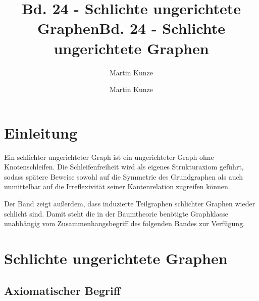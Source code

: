 \documentclass[main.tex]{subfiles}
\title{Bd. 24 - Schlichte ungerichtete Graphen}
\author{Martin Kunze}
\date{}
\begin{document}
\title{Bd. 24 - Schlichte ungerichtete Graphen}
\author{Martin Kunze}
\date{}
\hypersetup{pageanchor=false}
\maketitle
\hypersetup{pageanchor=true}
\setcounter{tocdepth}{3}
\tableofcontents
\setcounter{file}{24}
\renewcommand{\FormulaBandID}{24}

\chapter{Einleitung}

Ein schlichter ungerichteter Graph ist ein ungerichteter Graph ohne
Knotenschleifen. Die Schleifenfreiheit wird als eigenes Strukturaxiom
geführt, sodass spätere Beweise sowohl auf die Symmetrie des Grundgraphen
als auch unmittelbar auf die Irreflexivität seiner Kantenrelation zugreifen
können.

Der Band zeigt außerdem, dass induzierte Teilgraphen schlichter Graphen
wieder schlicht sind. Damit steht die in der Baumtheorie benötigte
Graphklasse unabhängig vom Zusammenhangsbegriff des folgenden Bandes zur
Verfügung.

\chapter{Schlichte ungerichtete Graphen}

\section{Axiomatischer Begriff}



\end{document}

